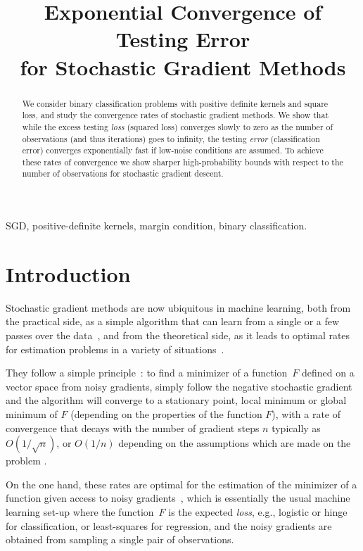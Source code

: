 \documentclass[final]{colt2018} %
\title[Exponential Convergence of Testing Error for Stochastic Gradient Methods]{Exponential Convergence of Testing Error\\
 for Stochastic Gradient Methods}
\begin{document}
\maketitle

\begin{abstract}
We consider binary classification problems with positive definite kernels and square loss, and study the convergence rates of stochastic gradient methods. We show that while the excess testing \emph{loss} (squared loss) converges slowly to zero as the number of observations (and thus iterations) goes to infinity, the testing \emph{error} (classification error) converges exponentially fast if low-noise conditions are assumed. To achieve these rates of convergence we show sharper high-probability bounds with respect to the number of observations for stochastic gradient descent.
\end{abstract}

\begin{keywords}
SGD, positive-definite kernels, margin condition, binary classification.
\end{keywords}

\section{Introduction}

Stochastic gradient methods are now ubiquitous in machine learning, both from the practical side, as a simple algorithm that can learn from a single or a few passes over the data~\citep{bottou2005line}, and from the theoretical side, as it leads to optimal rates for estimation problems in a variety of situations~\citep{nemirovsky1983problem,polyak1992acceleration}.

They follow a simple principle~\citep{robbins:monro:1951}: to find a minimizer of a function~$F$ defined on a vector space from noisy gradients, simply follow the negative stochastic gradient and the algorithm will converge to a stationary point, local minimum or global minimum of $F$ (depending on the properties of the function $F$), with a rate of convergence that decays with the number of gradient steps  $n$ typically as  $O(1/\sqrt{n})$, or $O(1/n)$ depending on the assumptions which are made on the problem \citep[see, e.g.,][]{polyak1992acceleration,nesterov2008confidence,nemirovski2009robust,shalev2007pegasos,xiao2010dual,gradsto,newsto,daft}.
 
  

 On the one hand, these rates are optimal for the estimation of the minimizer of a function given access to noisy gradients~\citep{nemirovsky1983problem}, which is essentially the usual machine learning set-up where the function~$F$ is the expected \emph{loss}, e.g., logistic or hinge for classification, or least-squares for regression, and the noisy gradients are obtained from sampling a single pair of observations.
\end{document}
